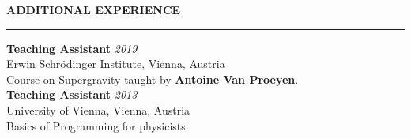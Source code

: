 \documentclass[a4paper,12pt]{report}
\newenvironment{rSection}[1]{ %
  \sectionskip
  \MakeUppercase{\bf #1} %
  \sectionlineskip
  \hrule %
  \begin{list}{}{ %
    \setlength{\leftmargin}{1.5em} %
  }
  \item[]
}{
  \end{list}
}
\def\sectionlineskip{\medskip} %
\def\sectionskip{\medskip} %
\begin{document}
      \begin{rSection}{Additional Experience}

            {\bf Teaching Assistant} \hfill {\em 2019}
            \\ Erwin Schrödinger Institute, Vienna, Austria
            \\ Course on Supergravity taught by {\bf Antoine Van Proeyen}.\vspace{7pt}
            \\{\bf Teaching Assistant} \hfill {\em 2013}
            \\ University of Vienna, Vienna, Austria
            \\ Basics of Programming for physicists.
            
            \end{rSection}
            
\end{document}
